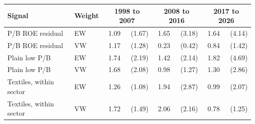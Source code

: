\begin{tabular}{llrrrrrr}
\toprule
Signal & Weight & \multicolumn{2}{c}{1998 to 2007} & \multicolumn{2}{c}{2008 to 2016} & \multicolumn{2}{c}{2017 to 2026} \\
\midrule
P/B ROE residual & EW & 1.09 & (1.67) & 1.65 & (3.18) & 1.64 & (4.14) \\
P/B ROE residual & VW & 1.17 & (1.28) & 0.23 & (0.42) & 0.84 & (1.42) \\
Plain low P/B & EW & 1.74 & (2.19) & 1.42 & (2.14) & 1.82 & (4.69) \\
Plain low P/B & VW & 1.68 & (2.08) & 0.98 & (1.27) & 1.30 & (2.86) \\
Textiles, within sector & EW & 1.26 & (1.08) & 1.94 & (2.87) & 0.99 & (2.07) \\
Textiles, within sector & VW & 1.72 & (1.49) & 2.06 & (2.16) & 0.78 & (1.25) \\
\bottomrule
\end{tabular}
